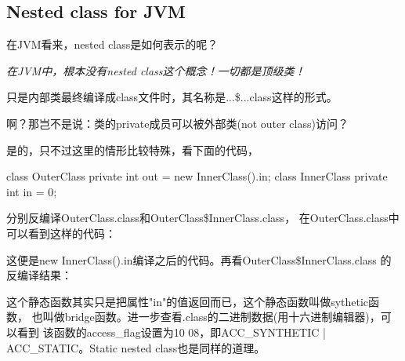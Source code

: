 \subsection[Nested class for JVM]{Nested class for JVM}
在JVM看来，nested class是如何表示的呢？

\emph{在JVM中，根本没有nested class这个概念！一切都是顶级类！}

只是内部类最终编译成class文件时，其名称是...\$...class这样的形式。

啊？那岂不是说：类的private成员可以被外部类(not outer class)访问？

是的，只不过这里的情形比较特殊，看下面的代码，

\begin{javacode}
class OuterClass {
  private int out = new InnerClass().in;
  class InnerClass {
    private int in = 0;
  }
}
\end{javacode}

分别反编译OuterClass.class和OuterClass\$InnerClass.class，
在OuterClass.class中可以看到这样的代码：


这便是new InnerClass().in编译之后的代码。再看OuterClass\$InnerClass.class
的反编译结果：


这个静态函数其实只是把属性"in"的值返回而已，这个静态函数叫做sythetic函数，
也叫做bridge函数。进一步查看.class的二进制数据(用十六进制编辑器)，可以看到
该函数的access\_flag设置为10 08，即ACC\_SYNTHETIC | ACC\_STATIC。Static nested
class也是同样的道理。
